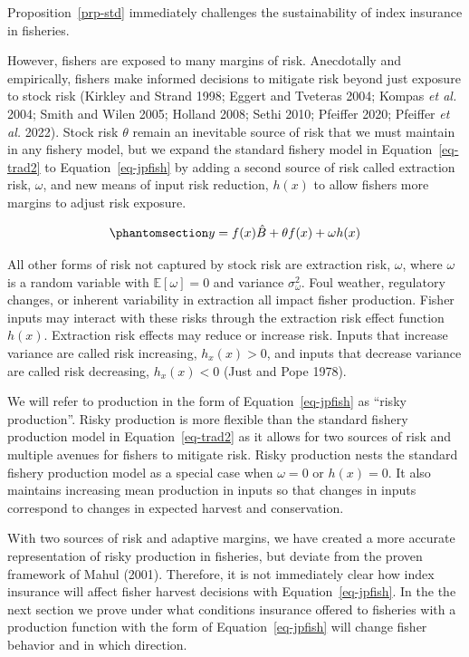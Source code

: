 \documentclass[
  letterpaper,
  DIV=11,
  numbers=noendperiod]{scrartcl}
\theoremstyle{plain}
\theoremstyle{plain}
\theoremstyle{remark}
\begin{document}
Proposition~\ref{prp-std} immediately challenges the sustainability of
index insurance in fisheries.

However, fishers are exposed to many margins of risk. Anecdotally and
empirically, fishers make informed decisions to mitigate risk beyond
just exposure to stock risk (Kirkley and Strand 1998; Eggert and
Tveteras 2004; Kompas \emph{et al.} 2004; Smith and Wilen 2005; Holland
2008; Sethi 2010; Pfeiffer 2020; Pfeiffer \emph{et al.} 2022). Stock
risk \(\theta\) remain an inevitable source of risk that we must
maintain in any fishery model, but we expand the standard fishery model
in Equation~\ref{eq-trad2} to Equation~\ref{eq-jpfish} by adding a
second source of risk called extraction risk, \(\omega\), and new means
of input risk reduction, \(h(x)\) to allow fishers more margins to
adjust risk exposure.

\begin{equation}\phantomsection\label{eq-jpfish}{
y=f(x)\hat{B}+\theta f(x)+\omega h(x)
}\end{equation}

All other forms of risk not captured by stock risk are extraction risk,
\(\omega\), where \(\omega\) is a random variable with
\(\mathbb{E}[\omega]=0\) and variance \(\sigma_\omega^2\). Foul weather,
regulatory changes, or inherent variability in extraction all impact
fisher production. Fisher inputs may interact with these risks through
the extraction risk effect function \(h(x)\). Extraction risk effects
may reduce or increase risk. Inputs that increase variance are called
risk increasing, \(h_x(x)>0\), and inputs that decrease variance are
called risk decreasing, \(h_x(x)<0\) (Just and Pope 1978).

We will refer to production in the form of Equation~\ref{eq-jpfish} as
``risky production''. Risky production is more flexible than the
standard fishery production model in Equation~\ref{eq-trad2} as it
allows for two sources of risk and multiple avenues for fishers to
mitigate risk. Risky production nests the standard fishery production
model as a special case when \(\omega=0\) or \(h(x)=0\). It also
maintains increasing mean production in inputs so that changes in inputs
correspond to changes in expected harvest and conservation.

With two sources of risk and adaptive margins, we have created a more
accurate representation of risky production in fisheries, but deviate
from the proven framework of Mahul (2001). Therefore, it is not
immediately clear how index insurance will affect fisher harvest
decisions with Equation~\ref{eq-jpfish}. In the the next section we
prove under what conditions insurance offered to fisheries with a
production function with the form of Equation~\ref{eq-jpfish} will
change fisher behavior and in which direction.
\end{document}
